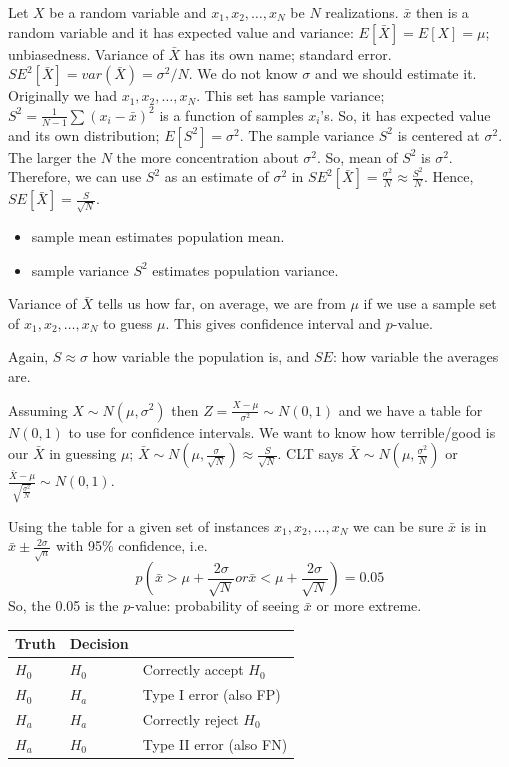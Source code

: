 Let $X$ be a random variable and $x_1, x_2, \dots, x_N$ be $N$ realizations.
$\bar x$ then is a random variable and it has expected value and variance:
$E[\bar X ] = E[X] = \mu$; unbiasedness. Variance of $\bar X$ has its own name; standard error.
$SE^2[\bar X] = var(\bar X) = \sigma^2/N$. We do not know $\sigma$ and we should
estimate it. Originally we had $x_1, x_2, \dots, x_N$. This set has sample variance;
$S^2 = \frac{1}{N-1}\sum(x_i - \bar x)^2$ is a function of samples $x_i$'s.
So, it has expected value and its own distribution; $E[S^2] = \sigma^2$. The sample
variance $S^2$ is centered at $\sigma^2$. The larger the $N$ the more
concentration about $\sigma^2$. So, mean of $S^2$ is $\sigma^2$. 
Therefore, we can use $S^2$ as an estimate of $\sigma^2$ in $SE^2[\bar X] = \frac{\sigma^2}{N}\approx \frac{S^2}{N}$. Hence, $SE[\bar X] = \frac{S}{\sqrt{N}}$.

\begin{itemize}
\item sample mean estimates population mean.
\item sample variance $S^2$ estimates population variance.
\end{itemize}
Variance of $\bar X$ tells us how far, on average, we are from $\mu$ 
if we use a sample set of $x_1, x_2, \dots, x_N$ to guess $\mu$.
This gives confidence interval and $p$-value.

Again, $S\approx \sigma$ how variable the population is, and $SE$: how variable
the averages are.

Assuming $X \sim N(\mu, \sigma^2)$ then $Z = \frac{X-\mu}{\sigma^2} \sim N(0, 1)$
and we have a table for $N(0, 1)$ to use for confidence intervals.
We want to know how terrible/good is our $\bar X$ in guessing $\mu$; $\bar X \sim N(\mu, \frac{\sigma}{\sqrt{N}}) \approx \frac{S}{\sqrt{N}}$.
CLT says $\bar X \sim N(\mu, \frac{\sigma^2}{N})$ or $\frac{\bar X - \mu}{  \sqrt{\frac{\sigma^2}{N}} } \sim N(0, 1)$.

Using the table for a given set of instances $x_1, x_2, \dots, x_N$ we can
be sure $\bar x$ is in $\bar x \pm   \frac{2\sigma}{\sqrt{n}}$ with 95\% confidence, i.e.
\begin{equation*}
p \left ( \bar x > \mu+\frac{2\sigma}{\sqrt{N}} or \bar x < \mu+\frac{2\sigma}{\sqrt{N}}  \right) = 0.05
\end{equation*}
So, the 0.05 is the $p$-value: probability of seeing $\bar x$ or more extreme.

\begin{table}[h!]
\begin{tabular}{|l|l|l|}
\hline
Truth & Decision &                        \\ \hline
$H_0$ & $H_0$    & Correctly accept $H_0$ \\ \hline
$H_0$ & $H_a$    & Type I error (also FP)      \\ \hline
$H_a$ & $H_a$    & Correctly reject $H_0$  \\ \hline
$H_a$ & $H_0$    & Type II error (also FN)  \\ \hline
\end{tabular}
\end{table}

